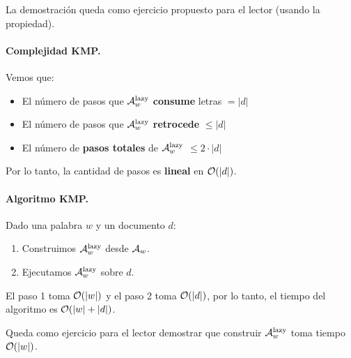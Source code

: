 La demostración queda como ejercicio propuesto para el lector (usando la propiedad).

\paragraph{Complejidad KMP.} Vemos que:
\begin{itemize}
    \item El número de pasos que $\mathcal{A}_w^\text{lazy}$ \textbf{consume} letras $= |d|$
    \item El número de pasos que $\mathcal{A}_w^\text{lazy}$ \textbf{retrocede} $\leq |d|$
    \item El número de \textbf{pasos totales} de $\mathcal{A}_w^\text{lazy}$ $\leq 2 \cdot |d|$
\end{itemize}
Por lo tanto, la cantidad de pasos es \textbf{lineal} en $\mathcal{O}(|d|)$.

\paragraph{Algoritmo KMP.} Dado una palabra $w$ y un documento $d$:
\begin{enumerate}
    \item Construimos $\mathcal{A}_w^\text{lazy}$ desde $\mathcal{A}_w$.
    \item Ejecutamos $\mathcal{A}_w^\text{lazy}$ sobre $d$.
\end{enumerate}

El paso 1 toma $\mathcal{O}(|w|)$ y el paso 2 toma $\mathcal{O}(|d|)$, por lo tanto, el tiempo del algoritmo es $\mathcal{O}(|w| + |d|)$. \medbreak

Queda como ejercicio para el lector demostrar que construir $\mathcal{A}_w^\text{lazy}$ toma tiempo $\mathcal{O}(|w|)$.




